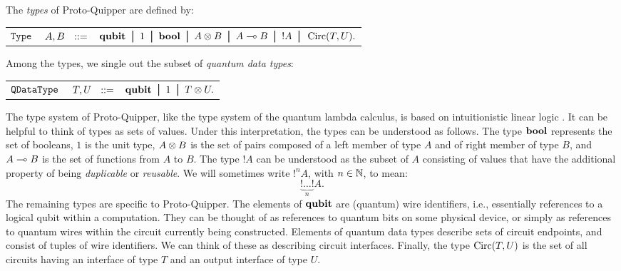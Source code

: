 \documentclass[twoside]{article}
\begin{document}
\begin{definition} 
The \emph{types} of Proto-Quipper are defined by:
\begin{center}
\begin{tabular}{rrl}
$\texttt{Type}$&$~A,B~~::=$ & $ \qubit \bor 1 \bor \bool \bor A\tensor B \bor 
A\loli B \bor !A \bor \Circ (T,U).$\\
\end{tabular}
\end{center}
Among the types, we single out the subset of \emph{quantum data types}:
\begin{center}
\begin{tabular}{rrl}
$\texttt{QDataType}$&$~T,U~~::=$ & $\qubit \bor 1 \bor T \tensor U.$
\end{tabular}
\end{center}
\end{definition}

The type system of Proto-Quipper, like the type system of the quantum
lambda calculus, is based on intuitionistic linear logic
{\cite{Gir87}}.  It can be helpful to think of types as sets of
values. Under this interpretation, the types can be understood as
follows. The type $\textrm{\bf bool}$ represents the set of booleans, $1$ is the
unit type, $A\otimes B$ is the set of pairs composed of a left member of
type $A$ and of right member of type $B$, and $A\multimap B$ is the set of
functions from $A$ to $B$. The type $!A$ can be understood as the
subset of $A$ consisting of values that have the additional property
of being \emph{duplicable} or \emph{reusable}. We will sometimes write
$!^nA$, with $n\in\mathbb{N}$, to mean:
\[
\underbrace{!\ldots !}_{n} A.
\]
The remaining types are specific to Proto-Quipper. The elements of
$\textrm{\bf qubit}$ are (quantum) wire identifiers, i.e., essentially references
to a logical qubit within a computation. They can be thought of as
references to quantum bits on some physical device, or simply as
references to quantum wires within the circuit currently being
constructed. Elements of quantum data types describe sets of circuit
endpoints, and consist of tuples of wire identifiers. We can think of
these as describing circuit interfaces. Finally, the type $\mathop{\textrm{Circ}}\nolimits(T,U)$
is the set of all circuits having an interface of type $T$ and an
output interface of type $U$. 
\end{document}
